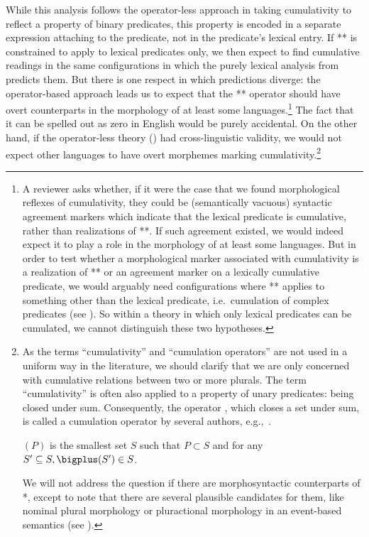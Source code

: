 \documentclass[output=paper]{langscibook}
\begin{document}
\noindent While this analysis follows the operator-less approach in taking cumulativity to reflect a property of binary predicates, this property is encoded in a separate expression attaching to the predicate, not in the predicate's lexical entry. If ** is constrained to apply to lexical predicates only,  we then expect to find cumulative readings in the same configurations in which the purely lexical analysis from  predicts them. But there is one respect in which predictions diverge: the operator-based approach leads us to expect that the ** operator should have overt counterparts in the morphology of at least some languages.\footnote{A reviewer asks whether, if it were the case that we found morphological reflexes of cumulativity, they could be (semantically vacuous) syntactic agreement markers which indicate that the lexical predicate is cumulative, rather than realizations of **. If such agreement existed, we would indeed expect it to play a role in the morphology of at least some languages. But in order to test whether a morphological marker associated with cumulativity is a realization of ** or an agreement marker on a lexically cumulative predicate, we would arguably need configurations where ** applies to something other than the lexical predicate, i.e.~cumulation of complex predicates (see ). So within a theory in which only lexical predicates can be cumulated, we cannot distinguish these two hypotheses.} The fact that it can be spelled out as zero in English would be purely accidental. On the other hand, if the operator-less theory () had cross-linguistic validity, we would not expect other languages to have overt morphemes marking cumulativity.{\footnote{As the terms 
``cumulativity'' and ``cumulation operators'' are not used in a uniform way in the literature, we should clarify that we are only concerned with cumulative relations between two or more plurals. The term ``cumulativity'' is often also applied to a property of unary predicates: being closed under sum. Consequently, the operator , which closes a set under sum, is called a cumulation operator by several authors, e.g.,~\citet{Sternefeld:1998}.

\ea \label{has-sch:onestar}\sib{*}$(P)$ is the smallest set $S$ such that $P \subset S$ and for any $S' \subseteq S, \bigplus(S') \in S$.\z

\noindent We will not address the question if there are morphosyntactic counterparts of *, except to note that there are several plausible candidates for them, like nominal plural morphology \citep{Sternefeld:1998} or pluractional morphology in an event-based semantics (see ).}}
\end{document}
